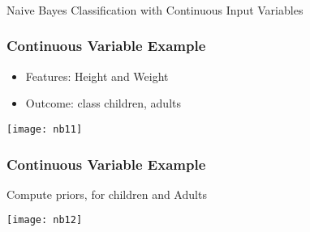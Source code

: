 %
%
%

\begin{frame}[fragile]\frametitle{}
\begin{center}
{\Large Naive Bayes Classification with Continuous Input Variables}
\end{center}
\end{frame}


\begin{frame}[fragile]\frametitle{Continuous Variable Example}
\begin{itemize}
\item    Features: Height and Weight
\item Outcome: class children, adults
\end{itemize}
\begin{center}
\texttt{[image: nb11]}
\end{center}
\end{frame}

\begin{frame}[fragile]\frametitle{Continuous Variable Example}
Compute priors, for children and Adults
\begin{center}
\texttt{[image: nb12]}
\end{center}
\end{frame}

